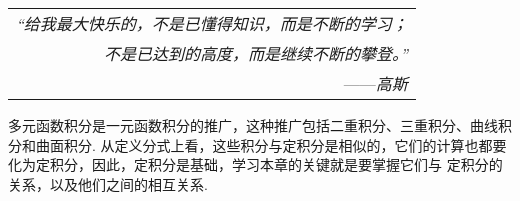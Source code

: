 \begin{flushright}
    \begin{tabular}{r|}
        \textit{“给我最大快乐的，不是已懂得知识，而是不断的学习；}\\
        \textit{不是已达到的高度，而是继续不断的攀登。”}\\
        ——\textit{高斯}
    \end{tabular}
\end{flushright}

多元函数积分是一元函数积分的推广，这种推广包括二重积分、三重积分、曲线积分和曲面积分.
从定义分式上看，这些积分与定积分是相似的，它们的计算也都要化为定积分，因此，定积分是基础，学习本章的关键就是要掌握它们与
定积分的关系，以及他们之间的相互关系.